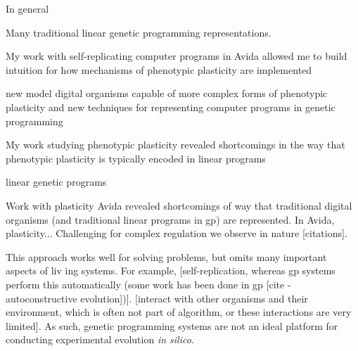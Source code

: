 
In general

Many traditional linear genetic programming representations.

My work with self-replicating computer programs in Avida allowed me to build intuition for how mechanisms of phenotypic plasticity are implemented 

new model digital organisms capable of more complex forms of phenotypic plasticity
and new techniques for representing computer programs in genetic programming

My work studying phenotypic plasticity revealed shortcomings in the way that phenotypic plasticity is typically encoded in linear programs 

linear genetic programs 

Work with plasticity Avida revealed shortcomings of way that traditional digital organisms (and traditional linear programs in gp) are represented. 
In Avida, plasticity...
Challenging for complex regulation we observe in nature [citations].


This approach works well for solving problems, but omits many important aspects of liv ing systems.
For example,
[self-replication, whereas gp systems perform this automatically (some work has been done in gp [cite - autoconstructive evolution])].
[interact with other organisms and their environment, which is often not part of algorithm, or these interactions are very limited].
As such, genetic programming systems are not an ideal platform for conducting experimental evolution \textit{in silico}. 


